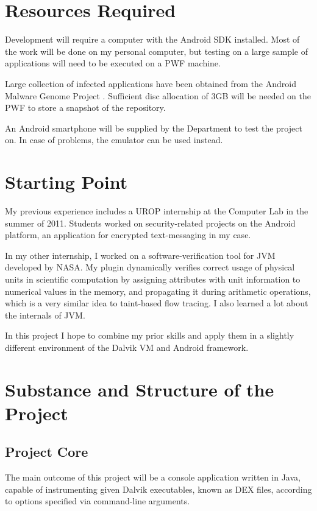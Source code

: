 \documentclass[12pt]{article}
\begin{document}
\section*{Resources Required}

Development will require a computer with the Android SDK installed. Most 
of the work will be done on my personal computer, but testing on a large 
sample of applications will need to be executed on a PWF machine. 

Large collection of infected applications have been obtained from the
Android Malware Genome Project \cite{www.malgenomeproject.org}. 
Sufficient disc allocation of 3GB will be needed on the PWF to store
a snapshot of the repository. 

An Android smartphone will be supplied by the Department to test 
the project on. In case of problems, the emulator can be used instead.

\section*{Starting Point}

My previous experience includes a UROP internship at the Computer Lab
in the summer of 2011. Students worked on security-related projects on
the Android platform, an application for encrypted text-messaging in my
case.

In my other internship, I worked on a software-verification tool for JVM 
developed by NASA. My plugin dynamically verifies correct usage of 
physical units in scientific computation by assigning attributes with
unit information to numerical values in the memory, and propagating
it during arithmetic operations, which is a very similar idea to 
taint-based flow tracing. I also learned a lot about the internals of
JVM.

In this project I hope to combine my prior skills and apply them in a 
slightly different environment of the Dalvik VM and Android framework.

\section*{Substance and Structure of the Project}

\subsection*{Project Core}

The main outcome of this project will be a console application written 
in Java, capable of instrumenting given Dalvik executables, known as DEX
files, according to options specified via command-line arguments. 
\end{document}
